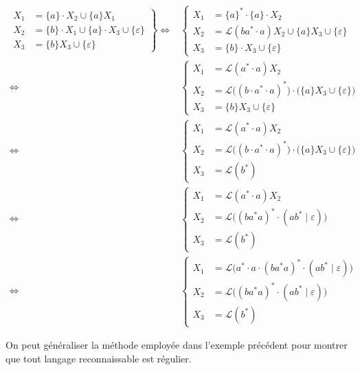 {{\begin{exm}
			\begin{align*}
				\left.\begin{array}{rl}
					X_1 &= \{a\} \cdot X_2 \cup \{a\} X_1\\
					X_2 &= \{b\} \cdot X_1 \cup \{a\} \cdot X_3 \cup \{\varepsilon\}\\
					X_3 &= \{b\} X_3 \cup \{\varepsilon\}
				\end{array}\right\}
				\iff& 
				\begin{cases}
					X_1&= \{a\}^* \cdot \{a\} \cdot X_2\\
					X_2&= \mathcal{L}(ba^* \cdot a) X_2 \cup \{a\} X_3 \cup \{\varepsilon\}\\
					X_3&= \{b\} \cdot X_3 \cup \{\varepsilon\}
				\end{cases}\\
				\iff& 
				\begin{cases}
					X_1&= \mathcal{L}(a^* \cdot a) X_2\\
					X_2&= \mathcal{L}\big((b\cdot a^* \cdot a)^*\big) \cdot \big(\{a\} X_3 \cup \{\varepsilon\}\big)\\
					X_3&= \{b\} X_3 \cup \{\varepsilon\}
				\end{cases}\\
				\iff& \begin{cases}
					X_1&= \mathcal{L}(a^* \cdot a) X_2\\
					X_2&= \mathcal{L}\big((b\cdot a^* \cdot a)^*\big) \cdot \big(\{a\} X_3 \cup \{\varepsilon\}\big)\\
					X_3&= \mathcal{L}(b^*)
				\end{cases} \\
				\iff& \begin{cases}
					X_1&= \mathcal{L}(a^* \cdot a) X_2\\
					X_2&= \mathcal{L}\big((ba^*a)^* \cdot (ab^*  \mid \varepsilon)\big)\\
					X_3&= \mathcal{L}(b^*)
				\end{cases} \\
				\iff& \begin{cases}
					X_1&= \mathcal{L}\big(a^* \cdot a \cdot (ba^*a)^* \cdot (ab^*  \mid \varepsilon)\big)\\
					X_2&= \mathcal{L}\big((ba^*a)^* \cdot (ab^*  \mid \varepsilon)\big)\\
					X_3&= \mathcal{L}(b^*)
				\end{cases}
			\end{align*}
		\end{exm}
	
		On peut généraliser la méthode employée dans l'exemple précédent pour montrer que tout langage reconnaissable est régulier.
	}
	\def\addmacros#1{#1}
}
